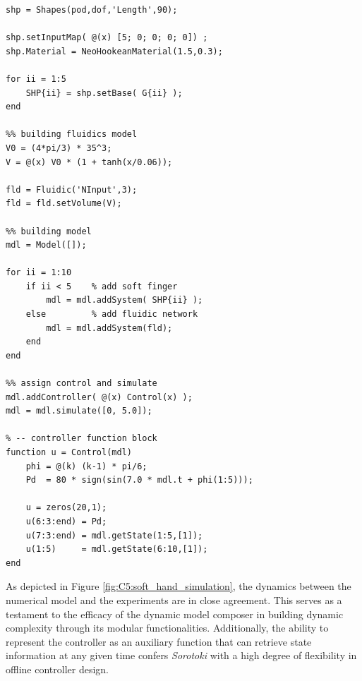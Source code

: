 \begin{lstlisting}[style=matlab]   
%% EXAMPLE: Model class
shp = Shapes(pod,dof,'Length',90);

shp.setInputMap( @(x) [5; 0; 0; 0; 0]) ;
shp.Material = NeoHookeanMaterial(1.5,0.3);

for ii = 1:5
    SHP{ii} = shp.setBase( G{ii} );
end
 
%% building fluidics model 
V0 = (4*pi/3) * 35^3;
V = @(x) V0 * (1 + tanh(x/0.06));

fld = Fluidic('NInput',3);
fld = fld.setVolume(V);

%% building model 
mdl = Model([]);

for ii = 1:10
    if ii < 5    % add soft finger
        mdl = mdl.addSystem( SHP{ii} );
    else         % add fluidic network
        mdl = mdl.addSystem(fld); 
    end
end

%% assign control and simulate
mdl.addController( @(x) Control(x) );
mdl = mdl.simulate([0, 5.0]);

% -- controller function block
function u = Control(mdl)
    phi = @(k) (k-1) * pi/6;
    Pd  = 80 * sign(sin(7.0 * mdl.t + phi(1:5)));

    u = zeros(20,1);
    u(6:3:end) = Pd;
    u(7:3:end) = mdl.getState(1:5,[1]);
    u(1:5)     = mdl.getState(6:10,[1]);
end
\end{lstlisting}

As depicted in Figure \ref{fig:C5:soft_hand_simulation}, the dynamics between the numerical model and the experiments are in close agreement. This serves as a testament to the efficacy of the dynamic model composer  in building dynamic complexity through its modular functionalities. Additionally, the ability to represent the controller as an auxiliary function that can retrieve state information at any given time confers \textit{Sorotoki} with a high degree of flexibility in offline controller design.